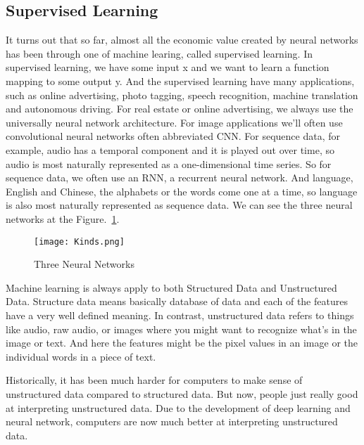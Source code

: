 \documentclass[a4paper]{article}
\begin{document}
\subsection{Supervised Learning}
 \par It turns out that so far, almost all the economic value created by neural networks has been through one of machine learing, called supervised learning. In supervised learning, we have some input x and we want to learn a function mapping to some output y. And the supervised learning have many applications, such as online advertising, photo tagging, speech recognition, machine translation and autonomous driving. For real estate or online advertising, we always use the universally neural network architecture. For image applications we'll often use convolutional neural networks often abbreviated CNN. For sequence data, for example, audio has a temporal component and it is played out over time, so audio is most naturally represented as a one-dimensional time series. So for sequence data, we often use an RNN, a recurrent neural network. And language, English and Chinese, the alphabets or the words come one at a time, so language is also most naturally represented as sequence data. We can see the three neural networks at the Figure.~\ref{kinds}.
\begin{figure}[htbp]
 \begin{center}
 \texttt{[image: Kinds.png]}
  \end{center}
 \caption{Three Neural Networks}
 \label{kinds}
\end{figure}
 \par Machine learning is always apply to both Structured Data and Unstructured Data. Structure data means basically database of data and each of the features have a very well defined meaning. In contrast, unstructured data refers to things like audio, raw audio, or images where you might want to recognize what's in the image or text. And here the features might be the pixel values in an image or the individual words in a piece of text. 
 \par Historically, it has been much harder for computers to make sense of unstructured data compared to structured data. But now, people just really good at interpreting unstructured data. Due to the development of deep learning and neural network, computers are now much better at interpreting unstructured data.
\end{document}
